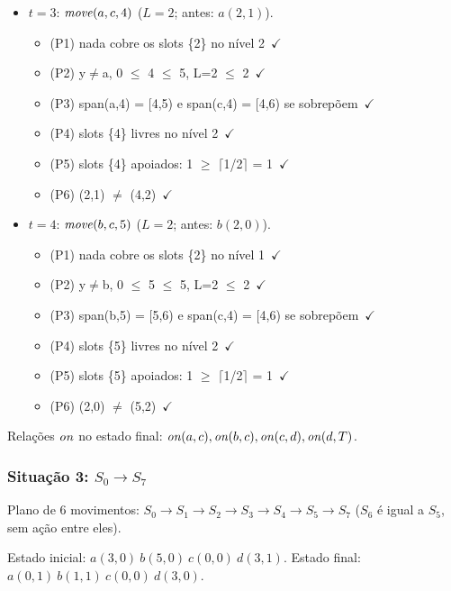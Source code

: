 \begin{itemize}
\begin{itemize}
\end{itemize}
\item $t=3$: $\mathit{move}(a,c,4)$ ($L=2$; antes: $a(2,1)$).
\begin{itemize}
\item (P1) nada cobre os slots \{2\} no nível 2\ $\checkmark$
\item (P2) y$\neq$a, 0 $\le$ 4 $\le$ 5, L=2 $\le$ 2\ $\checkmark$
\item (P3) span(a,4) = [4,5) e span(c,4) = [4,6) se sobrepõem\ $\checkmark$
\item (P4) slots \{4\} livres no nível 2\ $\checkmark$
\item (P5) slots \{4\} apoiados: 1 $\ge$ $\lceil$1/2$\rceil$ = 1\ $\checkmark$
\item (P6) (2,1) $\neq$ (4,2)\ $\checkmark$
\end{itemize}
\item $t=4$: $\mathit{move}(b,c,5)$ ($L=2$; antes: $b(2,0)$).
\begin{itemize}
\item (P1) nada cobre os slots \{2\} no nível 1\ $\checkmark$
\item (P2) y$\neq$b, 0 $\le$ 5 $\le$ 5, L=2 $\le$ 2\ $\checkmark$
\item (P3) span(b,5) = [5,6) e span(c,4) = [4,6) se sobrepõem\ $\checkmark$
\item (P4) slots \{5\} livres no nível 2\ $\checkmark$
\item (P5) slots \{5\} apoiados: 1 $\ge$ $\lceil$1/2$\rceil$ = 1\ $\checkmark$
\item (P6) (2,0) $\neq$ (5,2)\ $\checkmark$
\end{itemize}
\end{itemize}
Relações $\mathit{on}$ no estado final: $\mathit{on}(a,c), \mathit{on}(b,c), \mathit{on}(c,d), \mathit{on}(d,T)$.

\subsubsection{Situação 3: $S_0\to S_7$}
Plano de 6 movimentos: $S_0$$\to$$S_1$$\to$$S_2$$\to$$S_3$$\to$$S_4$$\to$$S_5$$\to$$S_7$ ($S_6$ é igual a $S_5$, sem ação entre eles).

Estado inicial: $a(3,0)\ b(5,0)\ c(0,0)\ d(3,1)$. Estado final: $a(0,1)\ b(1,1)\ c(0,0)\ d(3,0)$.

